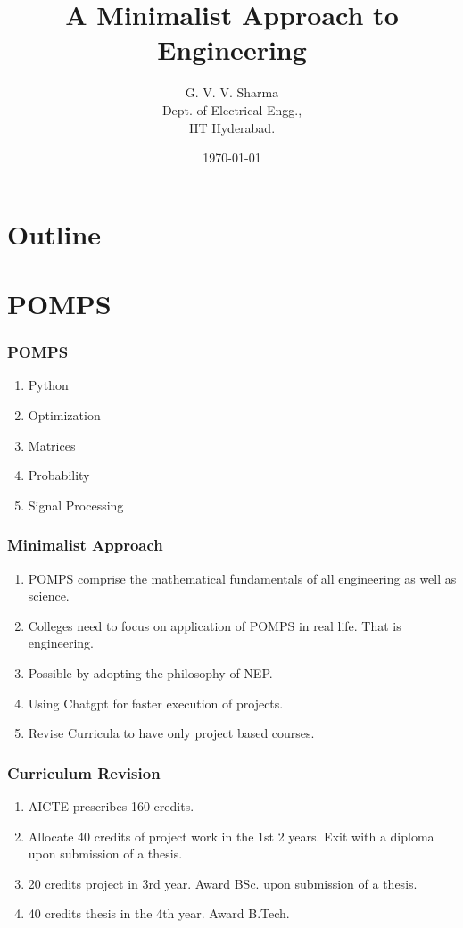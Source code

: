 \documentclass{beamer}
\title{A Minimalist Approach to Engineering}
\author{G. V. V. Sharma \\ Dept. of Electrical Engg.,\\IIT Hyderabad.}
\date{\today}
\theoremstyle{remark}
\begin{document}
\begin{frame}
\titlepage
\end{frame}

\section*{Outline}
\begin{frame}
\tableofcontents
\end{frame}
\section{POMPS}
\begin{frame}
\frametitle{POMPS}
\begin{enumerate}
\item Python
\item Optimization
\item Matrices
\item Probability
\item Signal Processing
\end{enumerate}
\end{frame}
%
\begin{frame}
\frametitle{Minimalist Approach}
\begin{enumerate}
\item POMPS comprise the mathematical fundamentals of all engineering as well as science.
\item Colleges need to focus on application of POMPS in real life. That is engineering.
\item Possible by adopting the philosophy of NEP.
\item Using Chatgpt for faster execution of projects.
\item Revise Curricula to have only project based courses.
\end{enumerate}
\end{frame}
%
\begin{frame}
\frametitle{Curriculum Revision}
\begin{enumerate}
\item AICTE prescribes 160 credits.
\item Allocate 40 credits of project work in the 1st 2 years. Exit with a diploma upon submission of a thesis.
\item 20 credits project in 3rd year. Award BSc. upon submission of a thesis.
\item 40 credits thesis in the 4th year. Award B.Tech.
\end{enumerate}
\end{frame}
%
\end{document}
